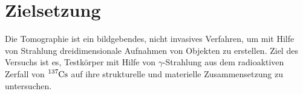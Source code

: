 \section{Zielsetzung}
\label{sec:zielsetzung}

Die Tomographie ist ein bildgebendes, nicht invasives Verfahren, um mit Hilfe
von Strahlung dreidimensionale Aufnahmen von Objekten zu erstellen. Ziel des
Versuchs ist es, Testkörper mit Hilfe von $\gamma$-Strahlung aus dem
radioaktiven Zerfall von $\ce{^{137}Cs}$ auf ihre strukturelle und materielle
Zusammensetzung zu untersuchen.
